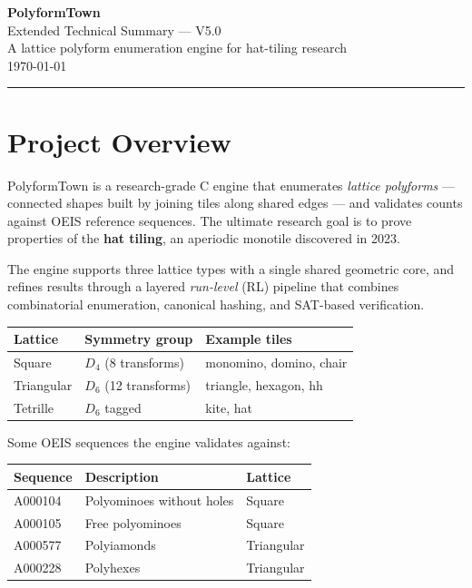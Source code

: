 \documentclass[10pt,a4paper]{article}
\let\polysection\section
\renewcommand\section{\needspace{0.16\textheight}\polysection}
\begin{document}
\begin{center}
  {\Huge\bfseries\color{titlecolor} PolyformTown}\\[4pt]
  {\large\color{headercolor} Extended Technical Summary — V5.0}\\[6pt]
  {\small A lattice polyform enumeration engine for hat-tiling research}\\[2pt]
  {\small\color{gray} \today}
\end{center}

\vspace{6pt}
\noindent\rule{\linewidth}{1pt}
\vspace{4pt}

\section{Project Overview}

PolyformTown is a research-grade C engine that enumerates
\emph{lattice polyforms} — connected shapes built by joining tiles
along shared edges — and validates counts against OEIS reference
sequences.  The ultimate research goal is to prove properties of the
\textbf{hat tiling}, an aperiodic monotile discovered in 2023.

The engine supports three lattice types with a single shared geometric
core, and refines results through a layered \emph{run-level} (RL)
pipeline that combines combinatorial enumeration, canonical hashing,
and SAT-based verification.

\vspace{4pt}
\begin{tabular}{@{}lll@{}}
\toprule
\textbf{Lattice} & \textbf{Symmetry group} & \textbf{Example tiles} \\
\midrule
Square      & $D_4$ (8 transforms)  & monomino, domino, chair \\
Triangular  & $D_6$ (12 transforms) & triangle, hexagon, hh   \\
Tetrille    & $D_6$ tagged          & kite, hat               \\
\bottomrule
\end{tabular}

\vspace{6pt}
Some OEIS sequences the engine validates against:

\vspace{2pt}
\begin{tabular}{@{}lll@{}}
\toprule
\textbf{Sequence} & \textbf{Description} & \textbf{Lattice} \\
\midrule
A000104 & Polyominoes without holes & Square \\
A000105 & Free polyominoes          & Square \\
A000577 & Polyiamonds               & Triangular \\
A000228 & Polyhexes                 & Triangular \\
\bottomrule
\end{tabular}
\end{document}
